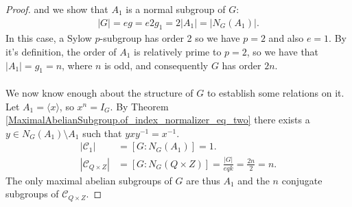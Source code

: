 \begin{proof}
and we show that $A_1$ is a normal subgroup of $G$:
\begin{align*} |G| = eg = e2g_1 = 2|A_1| = |N_G(A_1)|. 
\end{align*}
In this case, a Sylow $p$-subgroup has order 2 so we have $p=2$ and also $e=1$. By it's definition, the order of $A_1$ is relatively prime to $p=2$, so we have that $|A_1|= g_1 = n$, where $n$ is odd, and consequently $G$ has order $2n$. \\  
\\
We now know enough about the structure of $G$ to establish some relations on it. Let $A_1 = \langle x \rangle$, so $x^n = I_G$. By Theorem \ref{MaximalAbelianSubgroup.of_index_normalizer_eq_two} there exists a $y \in N_G(A_1) \! \setminus \! A_1$ such that $y x y^{-1} = x^{-1}$.
\begin{align*} |\mathcal{C}_1| &= [G : N_G(A_1)] = 1.
\\ |\mathcal{C}_{Q \times Z}| &= [G : N_G(Q \times Z)] = \frac{|G|}{eqk} = \frac{2n}{2} = n.
\end{align*}
The only maximal abelian subgroups of $G$ are thus $A_1$ and the $n$ conjugate subgroups of $\mathcal{C}_{Q \times Z}$.







\end{proof}
